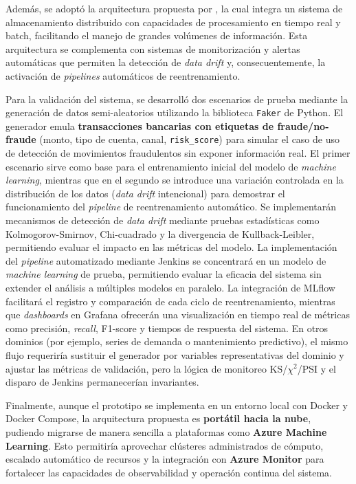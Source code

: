 Además, se adoptó la arquitectura propuesta por \citep{Chen2022}, la cual integra un sistema de almacenamiento distribuido con capacidades de procesamiento en tiempo real y batch, facilitando el manejo de grandes volúmenes de información. Esta arquitectura se complementa con sistemas de monitorización y alertas automáticas que permiten la detección de \textit{data drift} y, consecuentemente, la activación de \textit{pipelines} automáticos de reentrenamiento.

Para la validación del sistema, se desarrolló dos escenarios de prueba mediante la generación de datos semi-aleatorios utilizando la biblioteca \texttt{Faker} de Python. El generador emula \textbf{transacciones bancarias con etiquetas de fraude/no-fraude} (monto, tipo de cuenta, canal, \texttt{risk\_score}) para simular el caso de uso de detección de movimientos fraudulentos sin exponer información real. El primer escenario sirve como base para el entrenamiento inicial del modelo de \textit{machine learning}, mientras que en el segundo se introduce una variación controlada en la distribución de los datos (\textit{data drift} intencional) para demostrar el funcionamiento del \textit{pipeline} de reentrenamiento automático. Se implementarán mecanismos de detección de \textit{data drift} mediante pruebas estadísticas como Kolmogorov-Smirnov, Chi-cuadrado y la divergencia de Kullback-Leibler, permitiendo evaluar el impacto en las métricas del modelo. La implementación del \textit{pipeline} automatizado mediante Jenkins se concentrará en un modelo de \textit{machine learning} de prueba, permitiendo evaluar la eficacia del sistema sin extender el análisis a múltiples modelos en paralelo. La integración de MLflow facilitará el registro y comparación de cada ciclo de reentrenamiento, mientras que \textit{dashboards} en Grafana ofrecerán una visualización en tiempo real de métricas como precisión, \textit{recall}, F1-score y tiempos de respuesta del sistema. En otros dominios (por ejemplo, series de demanda o mantenimiento predictivo), el mismo flujo requeriría sustituir el generador por variables representativas del dominio y ajustar las métricas de validación, pero la lógica de monitoreo KS/$\chi^2$/PSI y el disparo de Jenkins permanecerían invariantes.

Finalmente, aunque el prototipo se implementa en un entorno local con Docker y Docker Compose, la arquitectura propuesta es \textbf{portátil hacia la nube}, pudiendo migrarse de manera sencilla a plataformas como \textbf{Azure Machine Learning}. Esto permitiría aprovechar clústeres administrados de cómputo, escalado automático de recursos y la integración con \textbf{Azure Monitor} para fortalecer las capacidades de observabilidad y operación continua del sistema.

